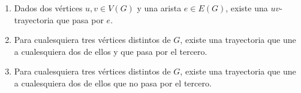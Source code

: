 \documentclass{article}
\begin{document}
\begin{enumerate}
\begin{enumerate}
  \item Dados dos v\'ertices $u,v \in V(G)$ y una arista $e \in E(G)$,
    existe una $uv$-trayectoria que pasa por $e$.

  \item Para cualesquiera tres v\'ertices distintos de $G$, existe una
    trayectoria que une a cualesquiera dos de ellos y que pasa por el
    tercero.

  \item Para cualesquiera tres v\'ertices distintos de $G$, existe una
    trayectoria que une a cualesquiera dos de ellos que no pasa por el
    tercero.
  \end{enumerate}
\end{enumerate}
\end{document}
